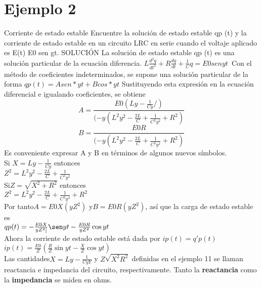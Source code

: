 \documentclass[12pt,a4paper]{article}
\begin{document}
\section*{Ejemplo 2 }
Corriente de estado estable
Encuentre la solución de estado estable qp (t) y la corriente de estado estable en un circuito LRC en serie cuando el voltaje aplicado es E(t)  E0
sen gt.
SOLUCIÓN La solución de estado estable qp
(t) es una solución particular de la ecuación diferencia.
$L\frac{d^2q}{dt^2} +R\frac{dq}{dt} + \frac{1}{C}q = E0 sen y t $\
Con el método de coeficientes indeterminados, se supone una solución particular de la forma
 $qp(t) =A sen* y t+ B cos* y t $ Sustituyendo esta expresión en la ecuación diferencial e igualando coeficientes, se obtiene
 \begin{equation}
  A = \frac{E0(Ly - \frac{1}{Cy}/)}{(-y(L^2y^2 -\frac{2L}{C} + \frac{1}{C^2y^2} + R^2)}
 \end{equation}
\begin{equation}
B = \frac{E0 R}{(-y(L^2y^2 -\frac{2L}{C} + \frac{1}{C^2y^2} + R^2)}
\end{equation}
Es conveniente expresar A y B en términos de algunos nuevos símbolos.\\
Si $X = Ly - \frac{1}{Cy}$ entonces\vspace{5mm}\\
$Z^2 = L^2y^2 -\frac{2L}{C}+ \frac{1}{C^2y^2}$\vspace{5mm}\\
Si$Z = \sqrt{X^2 + R^2}$ entonces\\
$Z^2 = L^2y^2 - \frac{2L}{C}+ \frac{1}{C^2y^2} + R^2$\vspace{5mm}\\
Por tanto$ A =E0X(yZ^2)$ y$ B =E0R(yZ^2)$, así que la carga de estado estable es\vspace{5mm}\\
$q{p}(t) = -\frac{E0X}{yZ^2]} \sen y t - \frac{E0R}{yZ^2}\cos yt $\vspace{5mm}\\
Ahora la corriente de estado estable está dada por $ip(t)= q'p(t)$\vspace{5mm}\\
$ip(t) = \frac{E0}{Z}(\frac{R}{Z}\sin yt - \frac{X}{Z}\cos yt)$\vspace{5mm}\\
Las cantidades$ X =Ly -\frac{1}{CyY} $ y $ Z \sqrt{X^2 R^2 }$ definidas en el ejemplo 11 se llaman reactancia e impedancia del circuito, respectivamente. Tanto la \textbf{reactancia}  como la \textbf{impedancia } se miden en ohms.
\end{document}
